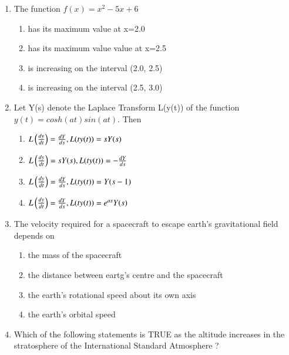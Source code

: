\documentclass[journal,12pt,onecolumn]{IEEEtran}
\theoremstyle{remark}
\begin{document}
\begin{enumerate}
		\begin{enumerate}
		\end{enumerate}
	\item The function $ f(x) = x^2 - 5x + 6 $
		\begin{enumerate}
				\item has its maximum value at x=2.0
				\item has its maximum value value at x=2.5
				\item is increasing on the interval (2.0, 2.5)
				\item is increasing on the interval (2.5, 3.0)
		\end{enumerate}
	\item Let Y(s) denote the Laplace Transform L(y(t)) of the function $ y(t) = cosh(at)sin(at) $. Then
		\begin{enumerate}
			\item $L\left(\frac{dy}{dt}\right) = \frac{dY}{ds}, L(ty(t)) = sY(s) $
			\item $L\left(\frac{dy}{dt}\right) = sY(s) , L(ty(t)) = -\frac{dY}{ds} $
			\item $L\left(\frac{dy}{dt}\right) = \frac{dY}{ds}, L(ty(t)) = Y(s-1) $
			\item $L\left(\frac{dy}{dt}\right) = \frac{dY}{ds}, L(ty(t)) = e^{as}Y(s) $
		\end{enumerate}
	\item The velocity required for a spacecraft to escape earth's gravitational field depends on
		\begin{enumerate}
			\item the mass of the spacecraft
			\item the distance between eartg's centre and the spacecraft
			\item the earth's rotational speed about its own axis
			\item the earth's orbital speed
		\end{enumerate}
	\item Which of the following statements is TRUE as the altitude increases in the stratosphere of the International Standard Atmosphere ?
		\begin{enumerate}

\end{enumerate}
\end{enumerate}
\end{document}

